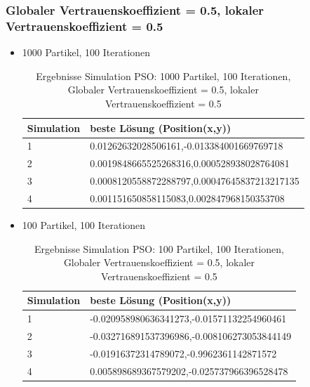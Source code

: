 \documentclass[a4paper, 11pt]{article}
\begin{document}
\subsubsection{Globaler Vertrauenskoeffizient = 0.5, lokaler Vertrauenskoeffizient = 0.5}
\begin{itemize}
	\item 1000 Partikel, 100 Iterationen
	\begin{table}[h]
		\begin{tabular}{p{2.5cm}|p{11cm}}
			Simulation & beste Lösung (Position(x,y))\\ \hline\hline
			1 & 0.01262632028506161,-0.013384001669769718\\ \hline
			2 & 0.0019848665525268316,0.000528938028764081\\ \hline
			3 & 0.0008120558872288797,0.00047645837213217135\\ \hline
			4 & 0.001151650858115083,0.002847968150353708\\ \hline
		\end{tabular}
		\caption{Ergebnisse Simulation \acs{PSO}: 1000 Partikel, 100 Iterationen, Globaler Vertrauenskoeffizient = 0.5, lokaler Vertrauenskoeffizient = 0.5}
		\label{tabframework}
	\end{table}
	\item 100 Partikel, 100 Iterationen
	\begin{table}[h]
		\begin{tabular}{p{2.5cm}|p{11cm}}
			Simulation & beste Lösung (Position(x,y))\\ \hline\hline
			1 & -0.020958980636341273,-0.01571132254960461\\ \hline
			2 & -0.032716891537396986,-0.008106273053844149\\ \hline
			3 & -0.01916372314789072,-0.9962361142871572\\ \hline
			4 & 0.005898689367579202,-0.025737966396528478\\ \hline
		\end{tabular}
		\caption{Ergebnisse Simulation \acs{PSO}: 100 Partikel, 100 Iterationen, Globaler Vertrauenskoeffizient = 0.5, lokaler Vertrauenskoeffizient = 0.5}
		\label{tabframework}
	\end{table}
\end{itemize}
\newpage
\end{document}
